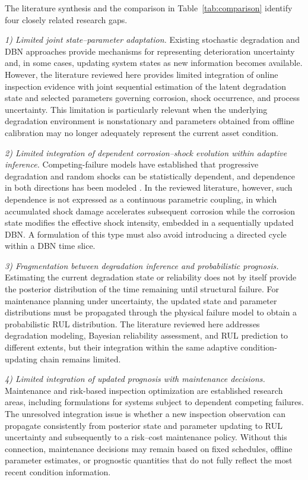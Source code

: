 \documentclass[journal]{IEEEtran}
\begin{document}
The literature synthesis and the comparison in
Table~\ref{tab:comparison} identify four closely related research gaps.

\textit{1) Limited joint state--parameter adaptation.}
Existing stochastic degradation and DBN approaches provide mechanisms
for representing deterioration uncertainty and, in some cases,
updating system states as new information becomes available. However,
the literature reviewed here provides limited integration of online
inspection evidence with joint sequential estimation of the latent
degradation state and selected parameters governing corrosion,
shock occurrence, and process uncertainty. This limitation is
particularly relevant when the underlying degradation environment is
nonstationary and parameters obtained from offline calibration may no
longer adequately represent the current asset condition.

\textit{2) Limited integration of dependent corrosion--shock evolution
within adaptive inference.}
Competing-failure models have established that progressive degradation
and random shocks can be statistically dependent, and dependence in both
directions has been modeled \cite{sun2021}. In the reviewed literature,
however, such dependence is not expressed as a continuous parametric
coupling, in which accumulated shock damage accelerates subsequent
corrosion while the corrosion state modifies the effective shock
intensity, embedded in a sequentially updated DBN. A formulation of
this type must also avoid introducing a directed cycle within a DBN
time slice.

\textit{3) Fragmentation between degradation inference and
probabilistic prognosis.}
Estimating the current degradation state or reliability does not by
itself provide the posterior distribution of the time remaining until
structural failure. For maintenance planning under uncertainty, the
updated state and parameter distributions must be propagated through
the physical failure model to obtain a probabilistic RUL distribution.
The literature reviewed here addresses degradation modeling, Bayesian
reliability assessment, and RUL prediction to different extents, but
their integration within the same adaptive condition-updating chain
remains limited.

\textit{4) Limited integration of updated prognosis with maintenance
decisions.}
Maintenance and risk-based inspection optimization are established
research areas, including formulations for systems subject to dependent
competing failures. The unresolved integration issue is whether a new
inspection observation can propagate consistently from posterior state
and parameter updating to RUL uncertainty and subsequently to a
risk--cost maintenance policy. Without this connection, maintenance
decisions may remain based on fixed schedules, offline parameter
estimates, or prognostic quantities that do not fully reflect the most
recent condition information.
\end{document}
